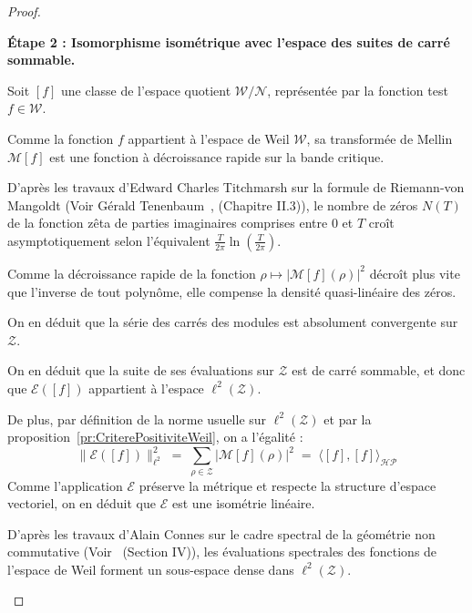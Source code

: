 \documentclass[Riemann_Hypothesis.tex]{subfiles}
\begin{document}
\begin{proof}
    \begin{part_proof}
        \textbf{Étape 2 : Isomorphisme isométrique avec l'espace des suites de carré sommable.} \par
        Soit $[f]$ une classe de l'espace quotient $\mathcal{W} / \mathcal{N}$, représentée par la fonction test $f \in \mathcal{W}$. \par
        Comme la fonction $f$ appartient à l'espace de Weil $\mathcal{W}$, sa transformée de Mellin $\mathcal{M}[f]$ est une fonction à décroissance rapide sur la bande critique. \par
        D'après les travaux d'Edward Charles Titchmarsh 
        sur la formule de Riemann-von Mangoldt 
        (Voir Gérald Tenenbaum~\cite{von-Manglot_tenenbaum2015_intro}, (Chapitre II.3)), 
        le nombre de zéros $N(T)$ de la fonction zêta de parties imaginaires comprises entre $0$ et $T$ croît asymptotiquement selon l'équivalent $\frac{T}{2\pi} \ln\left(\frac{T}{2\pi}\right)$. \par
        Comme la décroissance rapide de la fonction $\rho \mapsto |\mathcal{M}[f](\rho)|^2$ décroît plus vite que l'inverse de tout polynôme, elle compense la densité quasi-linéaire des zéros. \par
        On en déduit que la série des carrés des modules est absolument convergente sur $\mathcal{Z}$. \par
        On en déduit que la suite de ses évaluations sur $\mathcal{Z}$ est de carré sommable, et donc que $\mathcal{E}([f])$ appartient à l'espace $\ell^2(\mathcal{Z})$. \par
        De plus, par définition de la norme usuelle sur $\ell^2(\mathcal{Z})$ et par la proposition~\ref{pr:CriterePositiviteWeil}, on a l'égalité :
        \begin{equation*}
            \|\mathcal{E}([f])\|_{\ell^2}^2 \;=\; \sum_{\rho \in \mathcal{Z}} \left| \mathcal{M}[f](\rho) \right|^2 \;=\; \langle [f], [f] \rangle_{\mathcal{HP}}
        \end{equation*}
        Comme l'application $\mathcal{E}$ préserve la métrique et respecte la structure d'espace vectoriel, on en déduit que $\mathcal{E}$ est une isométrie linéaire. \par
        D'après les travaux d'Alain Connes sur le cadre spectral de la géométrie 
        non commutative (Voir~\cite{connes1999_trace} (Section IV)), les évaluations spectrales des fonctions de l'espace de Weil forment un sous-espace dense dans $\ell^2(\mathcal{Z})$. \par

\end{part_proof}
\end{proof}
\end{document}
